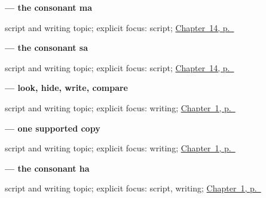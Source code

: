 \noindent\begin{minipage}[t]{\linewidth}
\raggedright
\textbf{ — the consonant ma}\par
\footnotesize script and writing topic; explicit focus: script; \hyperref[ch:pa-script-first]{Chapter~14, p.~\pageref*{ch:pa-script-first}}
\end{minipage}\par\smallskip

\noindent\begin{minipage}[t]{\linewidth}
\raggedright
\textbf{ — the consonant sa}\par
\footnotesize script and writing topic; explicit focus: script; \hyperref[ch:pa-script-first]{Chapter~14, p.~\pageref*{ch:pa-script-first}}
\end{minipage}\par\smallskip

\noindent\begin{minipage}[t]{\linewidth}
\raggedright
\textbf{ — look, hide, write, compare}\par
\footnotesize script and writing topic; explicit focus: writing; \hyperref[ch:greetings]{Chapter~1, p.~\pageref*{ch:greetings}}
\end{minipage}\par\smallskip

\noindent\begin{minipage}[t]{\linewidth}
\raggedright
\textbf{ — one supported copy}\par
\footnotesize script and writing topic; explicit focus: writing; \hyperref[ch:greetings]{Chapter~1, p.~\pageref*{ch:greetings}}
\end{minipage}\par\smallskip

\noindent\begin{minipage}[t]{\linewidth}
\raggedright
\textbf{ — the consonant ha}\par
\footnotesize script and writing topic; explicit focus: script, writing; \hyperref[ch:greetings]{Chapter~1, p.~\pageref*{ch:greetings}}
\end{minipage}\par\smallskip
